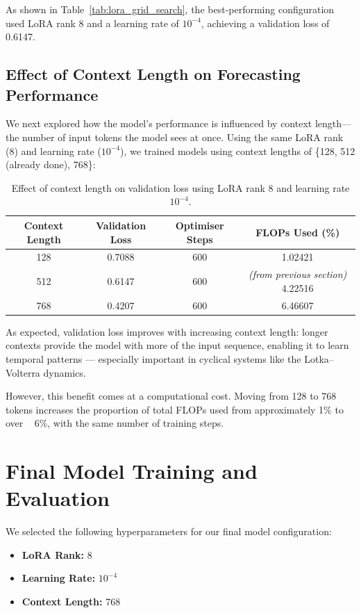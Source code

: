 \documentclass[a4paper,12pt]{article}
\begin{document}
As shown in Table~\ref{tab:lora_grid_search}, the best-performing configuration used LoRA rank 8 and a learning rate of $10^{-4}$, achieving a validation loss of 0.6147.

\subsection*{Effect of Context Length on Forecasting Performance}

We next explored how the model’s performance is influenced by context length—the number of input tokens the model sees at once. Using the same LoRA rank (8) and learning rate ($10^{-4}$), we trained models using context lengths of \{128, 512 (already done), 768\}:

\begin{table}[H]
  \centering
  \begin{tabular}{|c|c|c|c|}
    \hline
    \textbf{Context Length} & \textbf{Validation Loss} & \textbf{Optimiser Steps} & \textbf{FLOPs Used (\%)} \\
    \hline
    128 & 0.7088 & 600 & 1.02421 \\
    512 & 0.6147 & 600 & \textit{(from previous section)} 4.22516 \\
    768 & 0.4207 & 600 & 6.46607 \\
    \hline
  \end{tabular}
  \vspace{0.2cm}
  \caption{Effect of context length on validation loss using LoRA rank 8 and learning rate $10^{-4}$.}
  \label{tab:context_length_results}
\end{table}

As expected, validation loss improves with increasing context length: longer contexts provide the model with more of the input sequence, enabling it to learn temporal patterns — especially important in cyclical systems like the Lotka–Volterra dynamics.

However, this benefit comes at a computational cost. Moving from 128 to 768 tokens increases the proportion of total FLOPs used from approximately 1\% to over ~ 6\%, with the same number of training steps.

\section{Final Model Training and Evaluation}

We selected the following hyperparameters for our final model configuration:
\begin{itemize}
    \item \textbf{LoRA Rank:} 8
    \item \textbf{Learning Rate:} $10^{-4}$
    \item \textbf{Context Length:} 768
\end{itemize}
\end{document}
